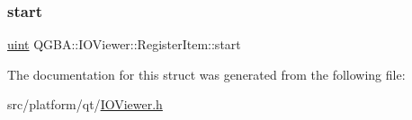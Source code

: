 \subsubsection{\texorpdfstring{start}{start}}
{\footnotesize\ttfamily \mbox{\hyperlink{gzlog_8c_a91ad9478d81a7aaf2593e8d9c3d06a14}{uint}} Q\+G\+B\+A\+::\+I\+O\+Viewer\+::\+Register\+Item\+::start}



The documentation for this struct was generated from the following file\+:\begin{DoxyCompactItemize}
\item 
src/platform/qt/\mbox{\hyperlink{_i_o_viewer_8h}{I\+O\+Viewer.\+h}}\end{DoxyCompactItemize}
